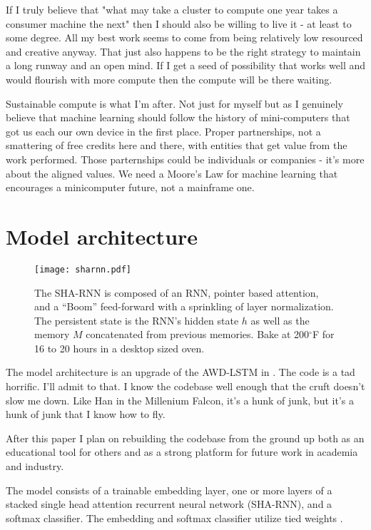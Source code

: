 \documentclass{article}
\begin{document}
If I truly believe that "what may take a cluster to compute one year takes a consumer machine the next" then I should also be willing to live it - at least to some degree.
All my best work seems to come from being relatively low resourced and creative anyway.
That just also happens to be the right strategy to maintain a long runway and an open mind.
If I get a seed of possibility that works well and would flourish with more compute then the compute will be there waiting.

Sustainable compute is what I'm after.
Not just for myself but as I genuinely believe that machine learning should follow the history of mini-computers that got us each our own device in the first place.
Proper partnerships, not a smattering of free credits here and there, with entities that get value from the work performed.
Those parternships could be individuals or companies - it's more about the aligned values.
We need a Moore's Law for machine learning that encourages a minicomputer future, not a mainframe one.

\section{Model architecture}

\begin{figure}[t]
 \centering 
 \texttt{[image: sharnn.pdf]}
\caption{The SHA-RNN is composed of an RNN, pointer based attention, and a ``Boom'' feed-forward with a sprinkling of layer normalization. The persistent state is the RNN's hidden state $h$ as well as the memory $M$ concatenated from previous memories.
Bake at 200$^{\circ}$F for 16 to 20 hours in a desktop sized oven.}
\label{fig:sharnn}
\end{figure}

The model architecture is an upgrade of the AWD-LSTM in \citet{merity2018regularizing}.
The code is a tad horrific.
I'll admit to that.
I know the codebase well enough that the cruft doesn't slow me down.
Like Han in the Millenium Falcon, it's a hunk of junk, but it's a hunk of junk that I know how to fly.

After this paper I plan on rebuilding the codebase from the ground up both as an educational tool for others and as a strong platform for future work in academia and industry.

The model consists of a trainable embedding layer, one or more layers of a stacked single head attention recurrent neural network (SHA-RNN), and a softmax classifier.
The embedding and softmax classifier utilize tied weights \cite{Inan2016,Press2016}.
\end{document}
